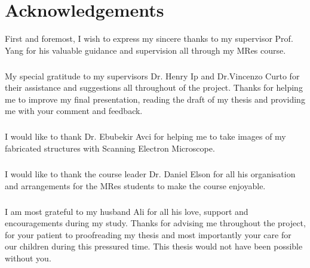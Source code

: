 \documentclass[12pt,a4paper,titlepage]{report}
\begin{document}


\setcounter{page}{1}
\thispagestyle{plain}
\chapter*{Acknowledgements}

First and foremost, I wish to express my sincere thanks to my supervisor Prof. Yang for his valuable guidance 
and supervision all through my MRes course.

\paragraph{}
My special gratitude to my supervisors Dr. Henry Ip and Dr.Vincenzo Curto for their assistance 
and suggestions all throughout of the project. Thanks for helping me to improve my final presentation, 
reading the draft of my thesis and providing me with your comment and feedback.

\paragraph{}
I would like to thank Dr. Ebubekir Avci for helping me to take images of my fabricated structures with 
Scanning Electron Microscope.

\paragraph{}
I would like to thank the course leader Dr. Daniel Elson for all his organisation and arrangements
 for the MRes students to make the course enjoyable.

\paragraph{}
  I am most grateful to my husband Ali for all his love, support and encouragements during 
my study. Thanks for advising me throughout the project, for your patient to proofreading my thesis
 and most importantly your care for our children during this pressured time. This thesis would not 
have been possible without you.
\end{document}
